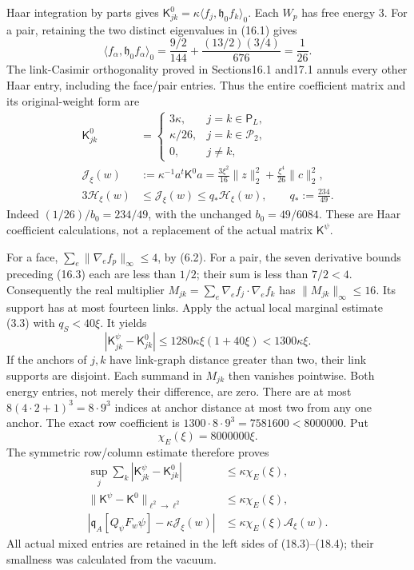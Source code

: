 \documentclass[
]{article}
\begin{document}
Haar integration by parts gives
\(\mathsf K^0_{jk}=\kappa\langle f_j,\mathfrak h_0f_k\rangle_0\). Each
\(W_p\) has free energy \(3\). For a pair, retaining the two distinct
eigenvalues in (16.1) gives \[
\langle f_\alpha,\mathfrak h_0 f_\alpha\rangle_0
 =\frac{9/2}{144}+\frac{(13/2)(3/4)}{676}=\frac1{26}.
\] The link-Casimir orthogonality proved in Sections16.1 and17.1 annuls
every other Haar entry, including the face/pair entries. Thus the entire
coefficient matrix and its original-weight form are \[
\begin{split}
\mathsf K^0_{jk}&=
\begin{cases}
3\kappa,&j=k\in\mathsf P_L,\\
\kappa/26,&j=k\in\mathscr P_2,\\
0,&j\ne k,
\end{cases}\\
\mathcal J_\xi(w)&:=\kappa^{-1}a^t\mathsf K^0a
 =\frac{3\xi^2}{16}\|z\|_2^2+\frac{\xi^4}{26}\|c\|_2^2,\\
3\mathcal H_\xi(w)&\le\mathcal J_\xi(w)
 \le q_*\mathcal H_\xi(w),\qquad q_*:=\frac{234}{49}.
\end{split}                                                   \tag{18.2}
\] Indeed \((1/26)/b_0=234/49\), with the unchanged \(b_0=49/6084\).
These are Haar coefficient calculations, not a replacement of the actual
matrix \(\mathsf K^\psi\).

For a face, \(\sum_e\|\nabla_e f_p\|_\infty\le4\), by (6.2). For a pair,
the seven derivative bounds preceding (16.3) each are less than \(1/2\);
their sum is less than \(7/2<4\). Consequently the real multiplier
\(M_{jk}=\sum_e\nabla_e f_j\cdot\nabla_e f_k\) has
\(\|M_{jk}\|_\infty\le16\). Its support has at most fourteen links.
Apply the actual local marginal estimate (3.3) with \(q_S<40\xi\). It
yields \[
|\mathsf K^\psi_{jk}-\mathsf K^0_{jk}|
 \le1280\kappa\xi(1+40\xi)<1300\kappa\xi .                 \tag{18.3}
\] If the anchors of \(j,k\) have link-graph distance greater than two,
their link supports are disjoint. Each summand in \(M_{jk}\) then
vanishes pointwise. Both energy entries, not merely their difference,
are zero. There are at most \(8(4\cdot2+1)^3=8\cdot9^3\) indices at
anchor distance at most two from any one anchor. The exact row
coefficient is \(1300\cdot8\cdot9^3=7581600<8000000\). Put \[
\chi_E(\xi)=8000000\xi.
\] The symmetric row/column estimate therefore proves \[
\begin{split}
\sup_j\sum_k|\mathsf K^\psi_{jk}-\mathsf K^0_{jk}|
 &\le\kappa\chi_E(\xi),\\
\|\mathsf K^\psi-\mathsf K^0\|_{\ell^2\to\ell^2}
 &\le\kappa\chi_E(\xi),\\
\left|\mathfrak q_A[Q_\psi F_w\psi]-\kappa\mathcal J_\xi(w)\right|
 &\le\kappa\chi_E(\xi)\mathcal A_\xi(w).
\end{split}                                                   \tag{18.4}
\] All actual mixed entries are retained in the left sides of
(18.3)--(18.4); their smallness was calculated from the vacuum.
\end{document}

